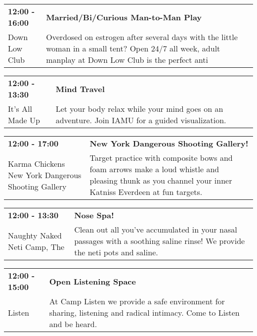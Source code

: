\begin{tabular}{ p{1in} p{2.2in} }
    \textbf{12:00 - 16:00} & \textbf{Married/Bi/Curious Man-to-Man Play} \\
    Down Low Club \newline  & Overdosed on estrogen after several days with the little woman in a small tent? Open 24/7 all week, adult manplay at Down Low Club is the perfect anti \\
    \hline 
\end{tabular}
    
\begin{tabular}{ p{1in} p{2.2in} }
    \textbf{12:00 - 13:30} & \textbf{Mind Travel} \\
    It's All Made Up \newline  & Let your body relax while your mind goes on an adventure. Join IAMU for a guided visualization. \\
    \hline 
\end{tabular}
    
\begin{tabular}{ p{1in} p{2.2in} }
    \textbf{12:00 - 17:00} & \textbf{New York Dangerous Shooting Gallery!} \\
    Karma Chickens \newline New York Dangerous Shooting Gallery & Target practice with composite bows and foam arrows make a loud whistle and pleasing thunk as you channel your inner Katniss Everdeen at fun targets. \\
    \hline 
\end{tabular}
    
\begin{tabular}{ p{1in} p{2.2in} }
    \textbf{12:00 - 13:30} & \textbf{Nose Spa! } \\
    Naughty Naked Neti Camp, The \newline  & Clean out all you've accumulated in your nasal passages with a soothing saline rinse! We provide the neti pots and saline. \\
    \hline 
\end{tabular}
    
\begin{tabular}{ p{1in} p{2.2in} }
    \textbf{12:00 - 15:00} & \textbf{Open Listening Space} \\
    Listen \newline  & At Camp Listen we provide a safe environment for sharing, listening and radical intimacy. Come to Listen and be heard. \\
    \hline 
\end{tabular}
    
